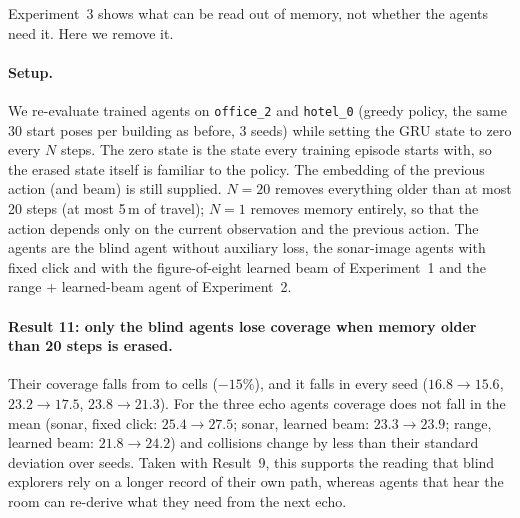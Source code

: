 Experiment~3 shows what can be read out of memory, not whether the agents need it. Here we remove it.

\paragraph{Setup.} We re-evaluate trained agents on \texttt{office\_2} and \texttt{hotel\_0} (greedy policy, the same 30 start poses per building as before, 3 seeds) while setting the GRU state to zero every $N$ steps. The zero state is the state every training episode starts with, so the erased state itself is familiar to the policy. The embedding of the previous action (and beam) is still supplied. $N=20$ removes everything older than at most 20 steps (at most 5\,m of travel); $N=1$ removes memory entirely, so that the action depends only on the current observation and the previous action. The agents are the blind agent without auxiliary loss, the sonar-image agents with fixed click and with the figure-of-eight learned beam of Experiment~1 and the range + learned-beam agent of Experiment~2.

\begin{table}[t]
\caption{Experiment 4. Exploration on \texttt{office\_2} and \texttt{hotel\_0} with the recurrent memory erased every 20 steps or every step (greedy, mean $\pm$ s.d.\ over 3 seeds). Entries: coverage in cells / collisions per episode / path length in metres.}
\label{tab:wipe}
\centering\small
\resizebox{\linewidth}{!}{%
}
\end{table}

\paragraph{Result 11: only the blind agents lose coverage when memory older than 20 steps is erased.} Their coverage falls from  to  cells ($-15\%$), and it falls in every seed ($16.8\to15.6$, $23.2\to17.5$, $23.8\to21.3$). For the three echo agents coverage does not fall in the mean (sonar, fixed click: $25.4\to27.5$; sonar, learned beam: $23.3\to23.9$; range, learned beam: $21.8\to24.2$) and collisions change by less than their standard deviation over seeds. Taken with Result~9, this supports the reading that blind explorers rely on a longer record of their own path, whereas agents that hear the room can re-derive what they need from the next echo.

